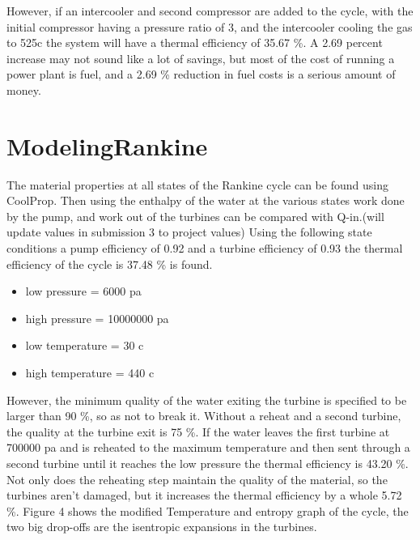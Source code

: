 \documentclass{article}
\begin{document}
However, if an intercooler and second compressor are added to the cycle, with the initial compressor having a pressure ratio of 3, and the intercooler cooling the gas to 525c the system will have a thermal efficiency of 35.67 \%.  A 2.69 percent increase may not sound like a lot of savings, but most of the cost of running a power plant is fuel, and a 2.69 \% reduction in fuel costs is a serious amount of money.
\section{ModelingRankine}
The material properties at all states of the Rankine cycle can be found using CoolProp. Then using the enthalpy of the water at the various states work done by the pump, and work out of the turbines can be compared with Q-in.(will update values in submission 3 to project values) Using the following state conditions a pump efficiency of 0.92 and a turbine efficiency of 0.93 the thermal efficiency of the cycle is 37.48 \% is found.
\begin{itemize}
\item  low pressure = 6000 pa
\item high pressure = 10000000 pa
\item low temperature = 30 c
\item high temperature = 440 c
\end{itemize}

However, the minimum quality of the water exiting the turbine is specified to be larger than 90 \%, so as not to break it. Without a reheat and a second turbine, the quality at the turbine exit is 75 \%. If the water leaves the first turbine at 700000 pa and is reheated to the maximum temperature and then sent through a second turbine until it reaches the low pressure the thermal efficiency is 43.20 \%. Not only does the reheating step maintain the quality of the material, so the turbines aren't damaged, but it increases the thermal efficiency by a whole 5.72 \%. Figure 4 shows the modified Temperature and entropy graph of the cycle, the two big drop-offs are the isentropic expansions in the turbines.
\end{document}
